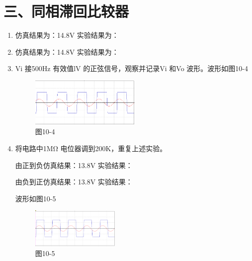 \documentclass[a4paper,10pt,notitlepage]{article}
\begin{document}
	\section*{三、同相滞回比较器}
	\begin{enumerate}
		\item 仿真结果为：14.8V \qquad\qquad  实验结果为：
		\item 仿真结果为：14.8V  \qquad\qquad 实验结果为：
		\item Vi 接500Hz 有效值lV 的正弦信号，观察并记录Vi 和Vo 波形。波形如图10-4
		\begin{figure}[h]
			\centering
			\includegraphics[width=0.5\textwidth]{5.png}
			\caption*{图10-4}
		\end{figure}
		\item 将电路中1MΩ 电位器调到200K，重复上述实验。\par 
		由正到负\qquad 仿真结果：13.8V  \qquad\qquad    实验结果：\par 
		由负到正\qquad 仿真结果：13.8V \qquad\qquad   实验结果：\par
		波形如图10-5
		\begin{figure}[h]
			\centering
			\includegraphics[width=0.4\textwidth]{6.png}
			\caption*{图10-5}
		\end{figure}
	\end{enumerate}
\end{document}
